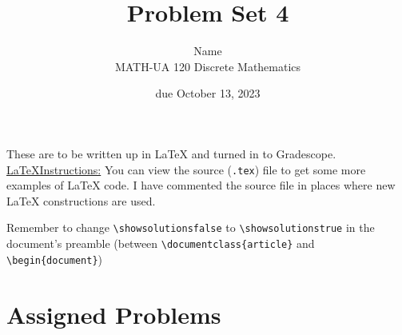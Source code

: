 \documentclass{article}
\title{Problem Set 4}
\author{%
    Name
\\  MATH-UA 120 Discrete Mathematics
}
\date{due October 13, 2023}
\newif\ifshowsolutions
\newcommand{\danger}{\marginpar[\hfill\dbend]{\dbend\hfill}}
\theoremstyle{definition}
\begin{document}
\maketitle



These are to be written up in \LaTeX{} and turned in to Gradescope.\\



\ifshowsolutions
    \SetupExSheets{solution/print=true}
\else
    \danger
 \underline{ \LaTeX  Instructions:}  You can view the source (\texttt{.tex}) file to get some more examples of \LaTeX{} code.  I have commented the source file in places where new \LaTeX{} constructions are used.
  
  Remember to change \verb|\showsolutionsfalse| to \verb|\showsolutionstrue|
    in the document's preamble 
    (between \verb|\documentclass{article}| and \verb|\begin{document}|)
\fi

\section*{Assigned Problems}
\end{document}

